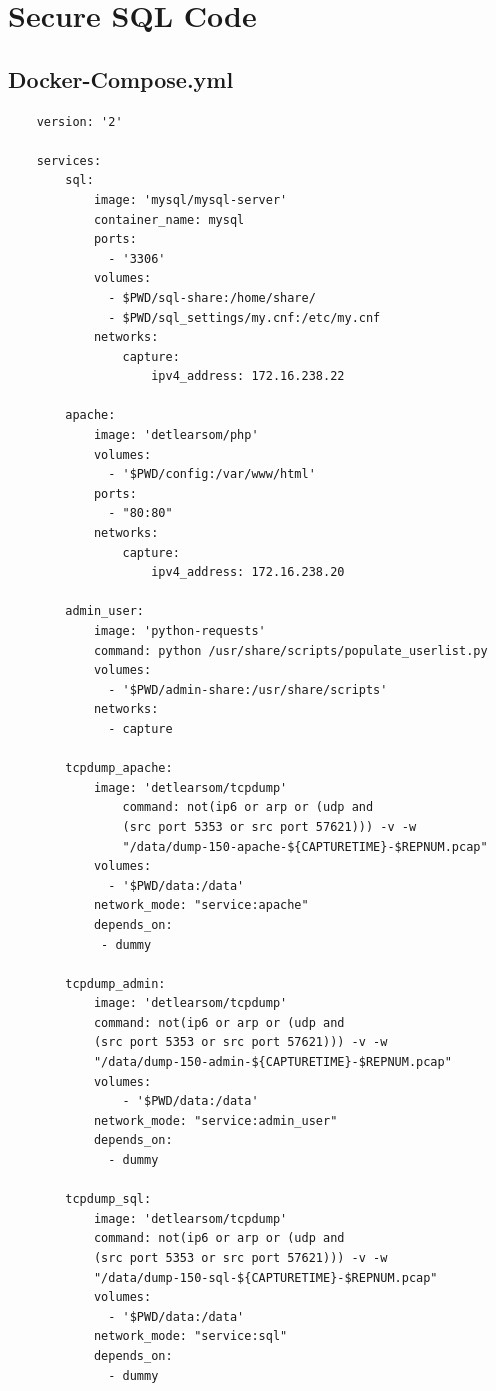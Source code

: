 \documentclass[msc,deptreport, cs]{infthesis} %
\begin{document}



 \appendix
% 
 \chapter{Secure SQL Code}
% 
\section{Docker-Compose.yml}
  \begin{verbatim}
    version: '2'

    services:
        sql:
            image: 'mysql/mysql-server'
            container_name: mysql
            ports:
              - '3306'
            volumes: 
              - $PWD/sql-share:/home/share/
              - $PWD/sql_settings/my.cnf:/etc/my.cnf
            networks:
                capture:
                    ipv4_address: 172.16.238.22
  
        apache:
            image: 'detlearsom/php'
            volumes:
              - '$PWD/config:/var/www/html'
            ports:
              - "80:80"
            networks:
                capture:
                    ipv4_address: 172.16.238.20

        admin_user:
            image: 'python-requests'
            command: python /usr/share/scripts/populate_userlist.py
            volumes:
              - '$PWD/admin-share:/usr/share/scripts'
            networks:
              - capture

        tcpdump_apache:
            image: 'detlearsom/tcpdump'
                command: not(ip6 or arp or (udp and
                (src port 5353 or src port 57621))) -v -w
                "/data/dump-150-apache-${CAPTURETIME}-$REPNUM.pcap"
            volumes:
              - '$PWD/data:/data'
            network_mode: "service:apache"
            depends_on:
             - dummy

        tcpdump_admin:
            image: 'detlearsom/tcpdump'
            command: not(ip6 or arp or (udp and
            (src port 5353 or src port 57621))) -v -w
            "/data/dump-150-admin-${CAPTURETIME}-$REPNUM.pcap"
            volumes:
                - '$PWD/data:/data'
            network_mode: "service:admin_user"
            depends_on:
              - dummy

        tcpdump_sql:
            image: 'detlearsom/tcpdump'
            command: not(ip6 or arp or (udp and
            (src port 5353 or src port 57621))) -v -w
            "/data/dump-150-sql-${CAPTURETIME}-$REPNUM.pcap"
            volumes:
              - '$PWD/data:/data'
            network_mode: "service:sql"
            depends_on:
              - dummy


\end{verbatim}
\end{document}
